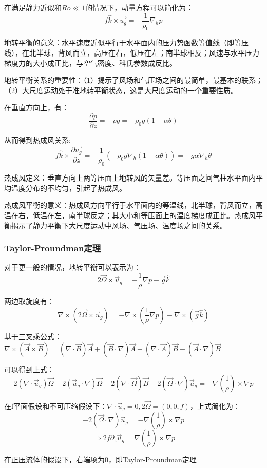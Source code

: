 \documentclass{article}
\begin{document}
在满足静力近似和$Ro \ll 1$的情况下，动量方程可以简化为：
$$f\hat{k}\times\vec{u_g}=-\frac{1}{\rho_0}\nabla_hp$$

地转平衡的意义：水平速度近似平行于水平面内的压力势函数等值线（即等压线），在北半球，背风而立，高压在右，低压在左；南半球相反；风速与水平压力梯度力的大小成正比，与空气密度、科氏参数成反比。

地转平衡关系的重要性：（1）揭示了风场和气压场之间的最简单，最基本的联系；（2）大尺度运动处于准地转平衡状态，这是大尺度运动的一个重要性质。

在垂直方向上，有：
$$\frac{\partial p}{\partial z} = -\rho g = -\rho_0g(1-\alpha\theta)$$

从而得到热成风关系:
$$f\hat{k}\times\frac{\partial \vec{u_g}}{\partial z}=-\frac{1}{\rho_0}\left(-\rho_0g\nabla_h(1-\alpha\theta)\right)=-g\alpha\nabla_h\theta$$

热成风定义：垂直方向上两等压面上地转风的矢量差。等压面之间气柱水平面内平均温度分布的不均匀，引起了热成风。

热成风平衡的意义：热成风方向平行于水平面内的等温线，北半球，背风而立，高温在右，低温在左，南半球反之；其大小和等压面上的温度梯度成正比。热成风平衡揭示了静力平衡下大尺度运动中风场、气压场、温度场之间的关系。

\subsubsection{Taylor-Proundman定理}
对于更一般的情况，地转平衡可以表示为：
$$2\vec{\Omega}\times\vec{u}_g = -\frac{1}{\rho}\nabla p - \vec{g}\hat{k}$$

两边取旋度有：
$$\nabla\times(2\vec{\Omega}\times\vec{u}_g) 
= -\nabla\times(\frac{1}{\rho}\nabla p) - \nabla\times(\vec{g}\hat{k})$$

基于三叉乘公式：$\nabla\times(\vec{A}\times\vec{B}) 
= (\nabla\cdot\vec{B})\vec{A} + (\vec{B}\cdot\nabla)\vec{A}
 - (\nabla\cdot\vec{A})\vec{B} - (\vec{A}\cdot\nabla)\vec{B}$

可以得到上式：
$$ 2(\nabla\cdot\vec{u}_g)\vec{\Omega} + 2(\vec{u}_g\cdot\nabla)\vec{\Omega}
 - 2(\nabla\cdot\vec{\Omega})\vec{B} - 2(\vec{\Omega}\cdot\nabla)\vec{u}_g
  = -\nabla(\frac{1}{\rho})\times\nabla p$$

在f平面假设和不可压缩假设下：$\nabla\cdot\vec{u}_g=0, 2\vec{\Omega} = (0,0,f)$，上式简化为：
$$  - 2(\vec{\Omega}\cdot\nabla)\vec{u}_g
  = -\nabla(\frac{1}{\rho})\times\nabla p$$
$$\Rightarrow  2f\partial_z\vec{u}_g
= \nabla(\frac{1}{\rho})\times\nabla p$$

在正压流体的假设下，右端项为0，即Taylor-Proundman定理
\end{document}
